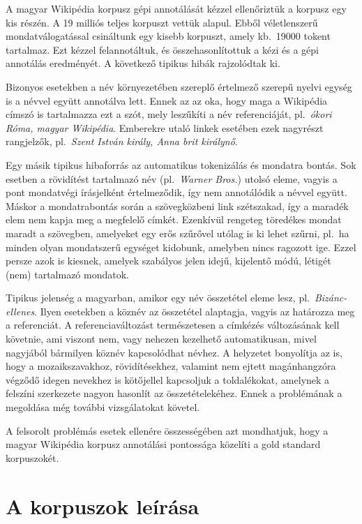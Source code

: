 \documentclass{llncs}
\begin{document}
A magyar Wikipédia korpusz gépi annotálását kézzel ellenőriztük a korpusz egy kis részén. A 19 milliós teljes korpuszt vettük alapul. Ebből véletlenszerű mondatválogatással csináltunk egy kisebb korpuszt, amely kb.~19000 tokent tartalmaz. Ezt kézzel felannotáltuk, és összehasonlítottuk a kézi és a gépi annotálás eredményét. A következő tipikus hibák rajzolódtak ki. 

Bizonyos esetekben a név környezetében szereplő értelmező szerepű nyelvi egység is a névvel együtt annotálva lett. Ennek az az oka, hogy maga a Wikipédia címszó is tartalmazza ezt a szót, mely leszűkíti a név referenciáját, pl.~\textit{ókori Róma, magyar Wikipédia}. Emberekre utaló linkek esetében ezek nagyrészt rangjelzők, pl.~\textit{Szent István király, Anna brit királynő}. 

Egy másik tipikus hibaforrás az automatikus tokenizálás és mondatra bontás. Sok esetben a rövidítést tartalmazó név (pl.~\textit{Warner Bros.}) utolsó eleme, vagyis a pont mondatvégi írásjelként értelmeződik, így nem annotálódik a névvel együtt. Máskor a mondatrabontás során a szövegközbeni link szétszakad, így a maradék elem nem kapja meg a megfelelő címkét. Ezenkívül rengeteg töredékes mondat maradt a szövegben, amelyeket egy erős szűrővel utólag is ki lehet szűrni, pl.~ha minden olyan mondatszerű egységet kidobunk, amelyben nincs ragozott ige. Ezzel persze azok is kiesnek, amelyek szabályos jelen idejű, kijelentő módú, létigét (nem) tartalmazó mondatok. 

Tipikus jelenség a magyarban, amikor egy név összetétel eleme lesz, pl.~\textit{Bizánc-ellenes}. Ilyen esetekben a köznév az összetétel alaptagja, vagyis az határozza meg a referenciát. A referenciaváltozást természetesen a címkézés változásának kell követnie, ami viszont nem, vagy nehezen kezelhető automatikusan, mivel nagyjából bármilyen köznév kapcsolódhat névhez. A helyzetet bonyolítja az is, hogy a mozaikszavakhoz, rövidítésekhez, valamint nem ejtett magánhangzóra végződő idegen nevekhez is kötőjellel kapcsoljuk a toldalékokat, amelynek a felszíni szerkezete nagyon hasonlít az összetételekéhez. Ennek a problémának a megoldása még további vizsgálatokat követel. 

A felsorolt problémás esetek ellenére összességében azt mondhatjuk, hogy a magyar Wikipédia korpusz annotálási pontossága közelíti a gold standard korpuszokét. %

\section{A korpuszok leírása}
\label{desc}
\end{document}
